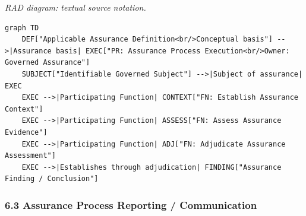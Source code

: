 \textit{RAD diagram: textual source notation.}
\begin{Verbatim}[breaklines,fontsize=\footnotesize]
graph TD
    DEF["Applicable Assurance Definition<br/>Conceptual basis"] -->|Assurance basis| EXEC["PR: Assurance Process Execution<br/>Owner: Governed Assurance"]
    SUBJECT["Identifiable Governed Subject"] -->|Subject of assurance| EXEC
    EXEC -->|Participating Function| CONTEXT["FN: Establish Assurance Context"]
    EXEC -->|Participating Function| ASSESS["FN: Assess Assurance Evidence"]
    EXEC -->|Participating Function| ADJ["FN: Adjudicate Assurance Assessment"]
    EXEC -->|Establishes through adjudication| FINDING["Assurance Finding / Conclusion"]
\end{Verbatim}
\label{rad:processes:387}



\label{rad:processes:389}
\subsubsection*{6.3 Assurance Process Reporting /\allowbreak{} Communication}
\label{rad:processes:391}

